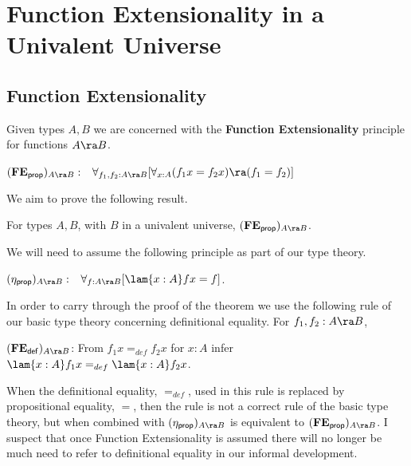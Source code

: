 
\section{Function Extensionality in a Univalent Universe}

\subsection{Function Extensionality}
\begin{defn}
Given types $A,B$ we are concerned with the {\bf Function Extensionality} principle for functions $A\ra B$.
\begin{center}
{\bf $({\bf FE_{\sf prop}})_{A\ra B}:\;\;$} 
  $\forall_{f_1,f_2:A\ra B}[\forall_{x:A}(f_1x=f_2x)\ra (f_1=f_2)]$
\end{center}
\end{defn}
We aim to prove the following result.
\begin{thm}\label{fe:thm}\label{thm:4.2} For types $A,B$, with $B$ in a univalent universe, 
$({\bf FE_{\sf prop}})_{A\ra B}$.
\end{thm}
We will need to assume the following principle as part of our type theory.
\begin{center}
{\bf $({\eta_{\sf prop}})_{A\ra B}:\;\;$} 
  $\forall_{f:A\ra B}[\lam{x:A}fx = f]$.
\end{center}

In order to carry through the proof of the theorem we use the following rule of our basic type theory concerning definitional equality.  For $f_1,f_2:A\ra B$,
\begin{center}
$({\bf FE_{\sf def}})_{A\ra B}$: From $f_1x=_{def}f_2x$ for $x:A$ infer $\lam{x:A}f_1x =_{def} \lam{x:A}f_2x$.
\end{center}
When the definitional equality, $=_{def}$,  used in this rule is replaced by propositional equality, $=$, then the rule is not a correct rule of the basic type theory, but when combined with $({\eta_{\sf prop}})_{A\ra B}$ is equivalent to $({\bf FE_{\sf prop}})_{A\ra B}$.  I suspect that once Function Extensionality is assumed there will no longer be much need to refer to definitional equality in our informal development.



